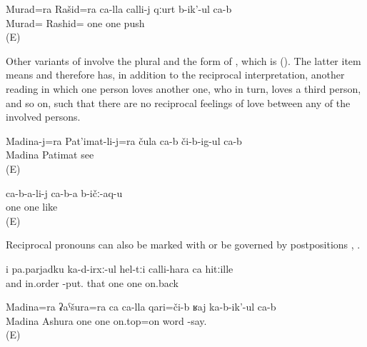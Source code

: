 \begin{exe}
	\ex	\label{ex:Murad and Rashid push each other.GEN}
	\gll	Murad=ra Rašid=ra ca-lla calli-j qːurt b-ik'-ul ca-b\\
	Murad= Rashid= one	one	push  \\
	\glt	{} (E)
\end{exe}


Other variants of  involve the plural   and the  form of  , which is   (). The latter item means  and therefore  has, in addition to the reciprocal interpretation, another reading in which one person loves another one, who in turn, loves a third person, and so on, such that there are no reciprocal feelings of love between any of the involved persons.
%
\begin{exe}
		\ex	\label{ex:Madina and Patimat see each other@14a}
		\gll	Madina-j=ra	Pat'imat-li-j=ra	čula	ca-b 	či-b-ig-ul	ca-b\\
			Madina	Patimat			see	\\
		\glt	{} (E)

		\ex	\label{ex:(They) love each other@14b}
		\gll	ca-b-a-li-j	ca-b-a	b-ičː-aq-u\\
			one	one	like\\
		\glt	{} (E)

\end{exe}

Reciprocal pronouns can also be marked with   or be governed by postpositions , .
%
\begin{exe}
	\ex	\label{ex:and putting them in order one after the other}
	\gll	i	pa.parjadku	ka-d-irxː-ul	hel-tːi	calli-hara	ca	hitːille\\
		and	in.order	-put.	that	one	one	on.back\\
	\glt	{}

	\ex	\label{ex:Madina and Ashura talk about each other}
	\gll	Madina=ra	ʡaˁšura=ra	ca	ca-lla	qari=či-b	ʁaj	ka-b-ik'-ul	ca-b\\
		Madina	Ashura	one	one	on.top=on	word	-say.	\\
	\glt	{} (E)
\end{exe}

